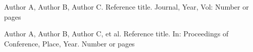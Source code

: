 \documentclass{SCIS2022cn}
\begin{document}

\begin{thebibliography}{99}

     Author A, Author B, Author C. Reference title. Journal, Year, Vol: Number or pages

     Author A, Author B, Author C, et al. Reference title. In: Proceedings of Conference, Place, Year. Number or pages

\end{thebibliography}



\makeentitle


\end{document}
